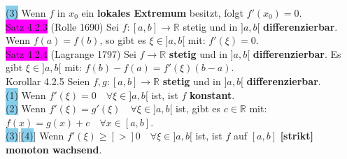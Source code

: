 \documentclass[landscape, 10pt]{article}
\newcommand{\R}{\mathbb{R}}
\begin{document}
\begin{multicols}{3}
                     \colorbox{SkyBlue}{(3)} Wenn \textcolor{NavyBlue}{$f$} in 
                            \textcolor{NavyBlue}{$x_0$} ein 
                            \textbf{lokales Extremum} 
                            besitzt, folgt \textcolor{NavyBlue}{$f'(x_0)=0$}.\\
              \colorbox{magenta}{Satz 4.2.3} 
              (Rolle 1690) 
                     Sei \textcolor{NavyBlue}{$f:[a,b]\longrightarrow\R$}
                     stetig und in \textcolor{NavyBlue}{$]a,b[$} 
                     \textbf{differenzierbar}. 
                     Wenn \textcolor{NavyBlue}{$f(a)=f(b)$}, so gibt es 
                     \textcolor{NavyBlue}{$\xi\in]a,b[$} mit: 
                     \textcolor{NavyBlue}{$f'(\xi)=0$}.\\
              \colorbox{magenta}{Satz 4.2.4}
              (Lagrange 1797) 
                     Sei \textcolor{NavyBlue}{$f\longrightarrow\R$}
                     \textbf{stetig} und in \textcolor{NavyBlue}{$]a,b[$} 
                     \textbf{differenzierbar}. 
                     Es gibt \textcolor{NavyBlue}{$\xi\in]a,b[$} mit: 
                     \textcolor{NavyBlue}{$f(b)-f(a)=f'(\xi)(b-a)$}.\\
              \colorbox{BurntOrange}{Korollar 4.2.5} 
                     Seien \textcolor{NavyBlue}{$f,g:[a,b]\longrightarrow\R$}
                     \textbf{stetig} und in \textcolor{NavyBlue}{$]a,b[$} 
                     \textbf{differenzierbar}.\\
                     \colorbox{SkyBlue}{(1)} Wenn 
                            \textcolor{NavyBlue}{$f'(\xi)=0\quad\forall\xi\in]a,b[$} ist, 
                            ist \textcolor{NavyBlue}{$f$} \textbf{konstant}.\\
                     \colorbox{SkyBlue}{(2)} Wenn 
                            \textcolor{NavyBlue}{$f'(\xi)=g'(\xi)\quad\forall\xi\in]a,b[$} 
                            ist, gibt es \textcolor{NavyBlue}{$c\in\R$} mit: 
                            \textcolor{NavyBlue}{
                            $f(x)=g(x)+c\quad\forall x\in[a,b]$}.\\
                     \colorbox{SkyBlue}{(3)}[\colorbox{SkyBlue}{(4)}] 
                            Wenn \textcolor{NavyBlue}{
                            $f'(\xi)\geqslant[>]0\quad\forall\xi\in]a,b[$} ist, 
                            ist \textcolor{NavyBlue}{$f$} auf 
                            \textcolor{NavyBlue}{$[a,b]$} 
                            \textbf{[strikt] monoton wachsend}.\\

\end{multicols}
\end{document}
